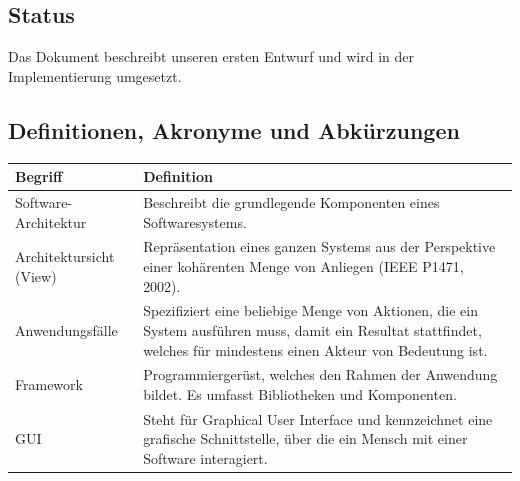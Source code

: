 \documentclass[fontsize=12pt,paper=a4,twoside]{scrartcl}
\begin{document}
\subsection{Status}
Das Dokument beschreibt unseren ersten Entwurf und wird in der Implementierung umgesetzt.
\subsection{Definitionen, Akronyme und Abkürzungen}
  \begin{longtable}{ |  l | p{12cm} |}
    \hline
    Begriff & Definition \\ \hline
Software-Architektur &Beschreibt die grundlegende Komponenten eines
Softwaresystems.\\ \hline
Architektursicht (View) &Repräsentation eines ganzen Systems
aus der Perspektive einer kohärenten Menge von
Anliegen (IEEE P1471, 2002). \\ \hline
 Anwendungsfälle & Spezifiziert eine beliebige Menge von Aktionen, die
ein System ausführen muss, damit ein Resultat stattfindet,
welches für mindestens einen Akteur von Bedeutung
ist. \\ \hline
    Framework &Programmiergerüst, welches den Rahmen der Anwendung
bildet. Es umfasst Bibliotheken und Komponenten. \\ \hline
GUI &Steht für Graphical User Interface und kennzeichnet
eine grafische Schnittstelle, über die ein Mensch mit
einer Software interagiert.\\ \hline
 

\end{longtable}
\end{document}
